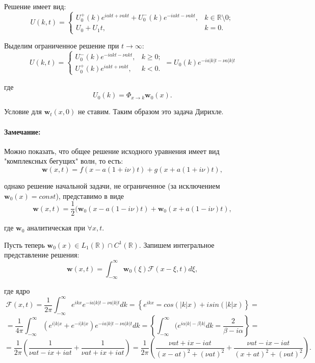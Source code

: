 \documentclass{article}
\newenvironment{observation}{ \paragraph{Замечание:}}{\\}
\begin{document}
Решение имеет вид:
\begin{equation*}
    U(k,t) =
	\begin{cases}
     U_0^+(k) e^{i a k t + \nu a k t} + U_0^-(k) e^{-i a k t - \nu a k t}, & k \in \mathbb{R} \setminus 0;\\
     U_0 + U_1 t,  & k =0.
     \end{cases}
\end{equation*}

Выделим ограниченное решение при $t \to \infty$:
\begin{equation*}
    U(k,t) =
	\begin{cases}
      U_0^-(k) e^{-i a k t - \nu a k t}, & k \geqslant 0;\\
      U_0^+(k) e^{i a k t + \nu a k t},  & k <0.
     \end{cases}
     = U_0(k) e^{-i a |k| t - \nu a |k| t}
\end{equation*}

где
\begin{equation*}
    U_0(k) = \Phi_{x \to k} \mathbf{w}_0(x).
\end{equation*}

Условие для $\mathbf{w}_t(x,0)$ не ставим. Таким образом это задача Дирихле.

\begin{observation}
Можно показать, что общее решение исходного уравнения имеет вид "комплексных бегущих" волн, то есть:
\begin{equation*}
\mathbf{w}(x,t) = f(x-a(1+i\nu)t) + g(x + a(1+i\nu)t),
\end{equation*}

однако решение начальной задачи, не ограниченное (за исключением $\mathbf{w}_0(x) = const$), представимо в виде
\begin{equation*}
\mathbf{w}(x,t) = \dfrac{1}{2}(\mathbf{w}_0 (x-a(1-i\nu)t) + \mathbf{w}_0(x + a(1-i\nu)t),
\end{equation*}

где $\mathbf{w}_0$ аналитическая при $\forall x,t$.
\end{observation}

Пусть теперь $\mathbf{w}_0(x) \in L_1(\mathbb{R}) \cap C^1(\mathbb{R})$. Запишем интегральное представление решения:
\begin{equation*}
    \mathbf{w}(x,t) = \int_{-\infty}^{\infty} \mathbf{w}_0(\xi) \mathcal{F}(x-\xi,t) d\xi,
\end{equation*}

где ядро
$$
\mathcal{F}(x,t) = \frac{1}{2\pi} \int_{-\infty}^{\infty} e^{i k x} e^{-i a |k|t - \nu a |k|t} d k 
= \left\{ e^{ikx} = cos(|k|x)+ i sin(|k|x) \right\} = 
$$$$
= \dfrac{1}{4 \pi} \int_{-\infty}^{\infty} (e^{i|k|x} + e^{-i|k|x}) e^{-ia|k|t - \nu a |k|t} dk  
= \left\{ \int_{-\infty}^{\infty} (e^{i \alpha |k| - \beta |k|} dk =
\dfrac{2}{\beta - i \alpha} \right\} =
$$$$
= \frac{1}{2\pi} \left( \frac{1}{\nu a t - i x + i a t} + \frac{1}{\nu a t + i x + i a t} \right) 
= \frac{1}{2\pi} \left( \frac{\nu a t + i x - i a t}{(x - a t)^2 + (\nu a t)^2} + 
\frac{\nu a t - i x - i a t}{(x + a t)^2 + (\nu a t)^2} \right).
$$ %
\end{document}
